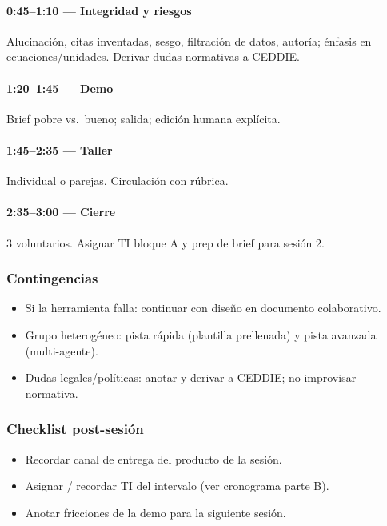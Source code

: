 \paragraph{0:45--1:10 --- Integridad y riesgos} Alucinación, citas inventadas, sesgo, filtración de datos, autoría; énfasis en ecuaciones/unidades. Derivar dudas normativas a CEDDIE.
\paragraph{1:20--1:45 --- Demo} Brief pobre vs.\ bueno; salida; edición humana explícita.
\paragraph{1:45--2:35 --- Taller} Individual o parejas. Circulación con rúbrica.
\paragraph{2:35--3:00 --- Cierre} 3 voluntarios. Asignar TI bloque A y prep de brief para sesión 2.

\subsubsection*{Contingencias}
\begin{itemize}
\item Si la herramienta falla: continuar con diseño en documento colaborativo.
\item Grupo heterogéneo: pista rápida (plantilla prellenada) y pista avanzada (multi-agente).
\item Dudas legales/políticas: anotar y derivar a CEDDIE; no improvisar normativa.
\end{itemize}

\subsubsection*{Checklist post-sesión}
\begin{itemize}
\item[$\square$] Recordar canal de entrega del producto de la sesión.
\item[$\square$] Asignar / recordar TI del intervalo (ver cronograma parte B).
\item[$\square$] Anotar fricciones de la demo para la siguiente sesión.
\end{itemize}
